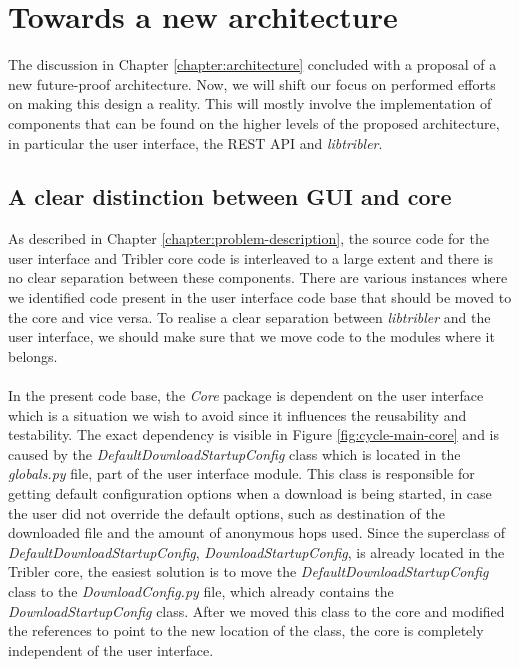 \chapter{Towards a new architecture}
\label{chapter:towards_new_architecture}
The discussion in Chapter \ref{chapter:architecture} concluded with a proposal of a new future-proof architecture. Now, we will shift our focus on performed efforts on making this design a reality. This will mostly involve the implementation of components that can be found on the higher levels of the proposed architecture, in particular the user interface, the REST API and \emph{libtribler}.

\section{A clear distinction between GUI and core}
As described in Chapter \ref{chapter:problem-description}, the source code for the user interface and Tribler core code is interleaved to a large extent and there is no clear separation between these components. There are various instances where we identified code present in the user interface code base that should be moved to the core and vice versa. To realise a clear separation between \emph{libtribler} and the user interface, we should make sure that we move code to the modules where it belongs.\\\\
In the present code base, the \emph{Core} package is dependent on the user interface which is a situation we wish to avoid since it influences the reusability and testability. The exact dependency is visible in Figure \ref{fig:cycle-main-core} and is caused by the \emph{DefaultDownloadStartupConfig} class which is located in the \emph{globals.py} file, part of the user interface module. This class is responsible for getting default configuration options when a download is being started, in case the user did not override the default options, such as destination of the downloaded file and the amount of anonymous hops used. Since the superclass of \emph{DefaultDownloadStartupConfig}, \emph{DownloadStartupConfig}, is already located in the Tribler core, the easiest solution is to move the \emph{DefaultDownloadStartupConfig} class to the \emph{DownloadConfig.py} file, which already contains the \emph{DownloadStartupConfig} class. After we moved this class to the core and modified the references to point to the new location of the class, the core is completely independent of the user interface.

